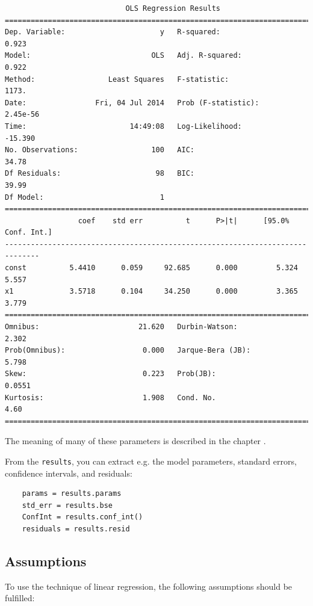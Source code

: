 \begin{lstlisting}
                            OLS Regression Results
==============================================================================
Dep. Variable:                      y   R-squared:                       0.923
Model:                            OLS   Adj. R-squared:                  0.922
Method:                 Least Squares   F-statistic:                     1173.
Date:                Fri, 04 Jul 2014   Prob (F-statistic):           2.45e-56
Time:                        14:49:08   Log-Likelihood:                -15.390
No. Observations:                 100   AIC:                             34.78
Df Residuals:                      98   BIC:                             39.99
Df Model:                           1
==============================================================================
                 coef    std err          t      P>|t|      [95.0% Conf. Int.]
------------------------------------------------------------------------------
const          5.4410      0.059     92.685      0.000         5.324     5.557
x1             3.5718      0.104     34.250      0.000         3.365     3.779
==============================================================================
Omnibus:                       21.620   Durbin-Watson:                   2.302
Prob(Omnibus):                  0.000   Jarque-Bera (JB):                5.798
Skew:                           0.223   Prob(JB):                       0.0551
Kurtosis:                       1.908   Cond. No.                         4.60
==============================================================================
\end{lstlisting}

The meaning of many of these parameters is described in the chapter .

From the \lstinline{results}, you can extract e.g. the model parameters, standard errors, confidence intervals, and residuals:

\begin{lstlisting}
    params = results.params
    std_err = results.bse
    ConfInt = results.conf_int()
    residuals = results.resid
\end{lstlisting}

\subsection{Assumptions}

To use the technique of linear regression, the following assumptions should be fulfilled:

